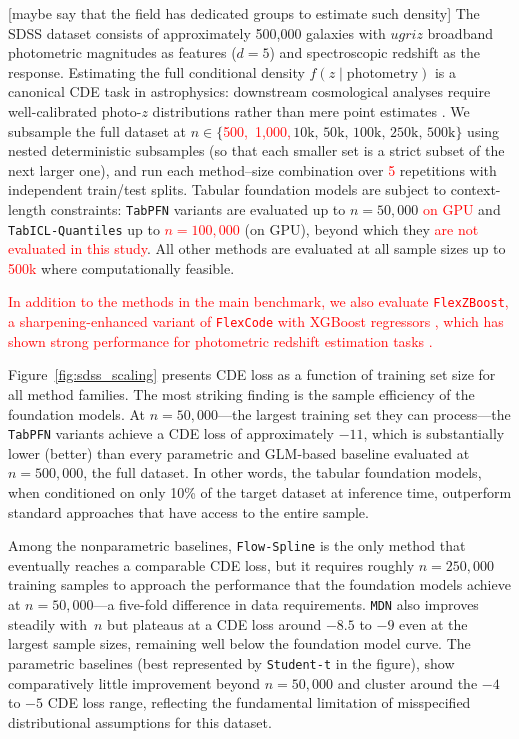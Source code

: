 \documentclass{article}
\newcommand{\method}[1]{\texttt{#1}}
\begin{document}
[maybe say that the field has dedicated groups to estimate such density]
The SDSS dataset consists of approximately 500{,}000 galaxies with
$ugriz$ broadband photometric magnitudes as features ($d=5$) and spectroscopic
redshift as the response.
Estimating the full conditional density $f(z \mid \text{photometry})$
is a canonical CDE task in astrophysics: downstream cosmological
analyses require well-calibrated photo-$z$ distributions rather than
mere point estimates \citep{schmidt2020evaluation,izbicki2017photo}.
We subsample the full dataset at
$n \in \{$\textcolor{red}{500,\, 1{,}000,}$\, 10\text{k},\, 50\text{k},\, 100\text{k},\, 250\text{k},\, 500\text{k}\}$
using nested deterministic subsamples (so that each smaller set is a
strict subset of the next larger one), and run each method--size
combination over \textcolor{red}{5} repetitions with independent train/test splits.
Tabular foundation models are subject to context-length constraints:
\method{TabPFN} variants are evaluated up to $n = 50{,}000$ \textcolor{red}{on GPU} and
\method{TabICL-Quantiles} up to \textcolor{red}{$n = 100{,}000$} (on GPU), beyond which
they \textcolor{red}{are not evaluated in this study}.
All other methods are evaluated at all sample sizes up to \textcolor{red}{500k} where
computationally feasible.

\textcolor{red}{In addition to the methods in the main benchmark, we also evaluate \method{FlexZBoost}, a sharpening-enhanced variant of \method{FlexCode} with XGBoost regressors \citep{dalmasso2020cdetools}, which has shown strong performance for photometric redshift estimation tasks \citep{schmidt2020evaluation}.}


Figure~\ref{fig:sdss_scaling} presents CDE loss as a function of
training set size for all method families.
The most striking finding is the sample efficiency of the foundation
models.
At $n = 50{,}000$---the largest training set they can process---the
\method{TabPFN} variants achieve a CDE loss of approximately $-11$,
which is substantially lower (better) than every parametric and
GLM-based baseline evaluated at $n = 500{,}000$, the full dataset.
In other words, the tabular foundation models, when conditioned on only 10\% of the target dataset at inference time, outperform standard approaches that have access to the entire sample.

Among the nonparametric baselines, \method{Flow-Spline} is the
only method that eventually reaches a comparable CDE loss, but it
requires roughly $n = 250{,}000$ training samples to approach the
performance that the foundation models achieve at $n = 50{,}000$---a
five-fold difference in data requirements.
\method{MDN} also improves steadily with~$n$ but plateaus at a
CDE loss around $-8.5$ to $-9$ even at the largest sample sizes,
remaining well below the foundation model curve.
The parametric baselines (best represented by \method{Student-t} in the figure),
show comparatively little improvement beyond $n = 50{,}000$ and
cluster around the $-4$ to $-5$ CDE loss range, reflecting the
fundamental limitation of misspecified distributional assumptions for
this dataset.
\end{document}
